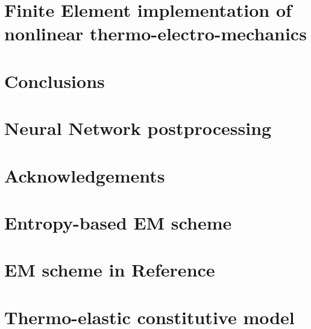 \documentclass[preprint,12pt]{elsarticle}
\begin{document}
\section{Finite Element implementation of nonlinear thermo-electro-mechanics}\label{sec:FEM residuals}
%


%
\clearpage

\section{Conclusions}\label{sec:conclusions}
%
\newpage
\section{Neural Network postprocessing}\label{sec:NN_cal}
\section{Acknowledgements}



\newpage
\appendix
\section{Entropy-based EM scheme}\label{sec:entropy-based formulation}
%
\newpage

\newpage
\section{EM scheme in Reference \cite{Betsch2018Thermo}}\label{sec:Betsch formulation}
% 
\newpage
\section{Thermo-elastic constitutive model}\label{sec:constitutive model appendix}
% 
\newpage
%
%
\end{document}
